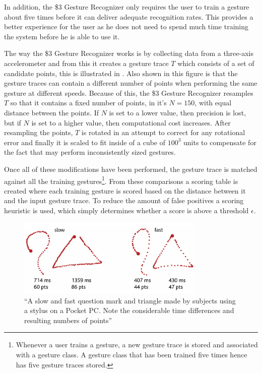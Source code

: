 In addition, the \$3 Gesture Recognizer only requires the user to train a gesture about five times before it can deliver adequate recognition rates. This provides a better experience for the user as he does not need to spend much time training the system before he is able to use it.

The way the \$3 Gesture Recognizer works is by collecting data from a three-axis accelerometer and from this it creates a gesture trace $T$ which consists of a set of candidate points, this is illustrated in .
Also shown in this figure is that the gesture traces can contain a different number of points when performing the same gesture at different speeds.
Because of this, the \$3 Gesture Recognizer resamples $T$ so that it contains a fixed number of points, in \cite{threedollar} it's $N = 150$, with equal distance between the points.
If $N$ is set to a lower value, then precision is lost, but if $N$ is set to a higher value, then computational cost increases.
After resampling the points, $T$ is rotated in an attempt to correct for any rotational error and finally it is scaled to fit inside of a cube of $100^3$ units to compensate for the fact that may perform inconsistently sized gestures.

Once all of these modifications have been performed, the gesture trace is matched against all the training gestures\footnote{Whenever a user trains a gesture, a new gesture trace is stored and associated with a gesture class. A gesture class that has been trained five times hence has five gesture traces stored.}.
From these comparisons a scoring table is created where each training gesture is scored based on the distance between it and the input gesture trace. To reduce the amount of false positives a scoring heuristic is used, which simply determines whether a score is above a threshold $\epsilon$.

\begin{figure}[!htb]
  \centering
  \includegraphics[width=0.8\textwidth]{images/1-dollar-gesturetrace.png}
  \caption[Some Caption]{``A slow and fast question mark and triangle made by
subjects using a stylus on a Pocket PC. Note the considerable time
differences and resulting numbers of points''\footnotemark}
\label{fig:onedollar-gesturetrace}
\end{figure}
